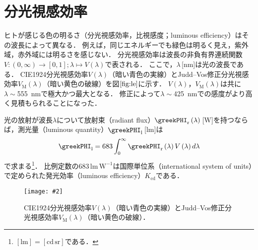 \documentclass[uplatex,paper=a4,fontsize=4.0truemm,jafontsize=4.0truemm,head_space=30.0truemm,foot_space=30.0truemm,baselineskip=8.0truemm,line_length=40zw,gutter=25.0truemm,oneside,openany,fleqn,hanging_panctuation,open_bracket_pos=nibu_tentsuki,dvipdfmx,jis2004,book,titlepage]{jlreq}
\theoremstyle{mystyle}
\newcommand{\captiondot}[1]{\caption{#1．}}
\newcommand{\figureinput}[4]{\begin{figure}[btp]\centering\texttt{[image: \#2]}\captiondot{#3}\label{fig:#4}\end{figure}}
\newcommand{\mathdisplaystyle}[1]{\(\displaystyle{#1}\)}
\newcommand{\Reference}[1]{\mathdisplaystyle{\ref{#1}}}
\newcommand{\negativevalue}[1]{{-#1}}
\newcommand{\parentheses}[1]{\left(#1\right)}
\newcommand{\squarebrackets}[1]{\left[#1\right]}
\begin{document}
		\section{分光視感効率}
			ヒトが感じる色の明るさ（分光視感効率，比視感度；luminous efficiency）はその波長によって異なる．
			例えば，同じエネルギーでも緑色は明るく見え，紫外域，赤外域には明るさを感じない．
			分光視感効率は波長の非負有界連続関数\mathdisplaystyle{V\colon\parentheses{0,\infty}\to\squarebrackets{0,1};\lambda\mapsto V\parentheses{\lambda}}で表される．
			ここで，\mathdisplaystyle{\lambda}\,[nm]は光の波長である．
			CIE1924分光視感効率\mathdisplaystyle{V\parentheses{\lambda}}（暗い青色の実線）とJudd--Vos修正分光視感効率\mathdisplaystyle{V_\textrm{M}\parentheses{\lambda}}\cite{Vos1978}（暗い黄色の破線）を図\Reference{fig:le}に示す．
			\mathdisplaystyle{V\parentheses{\lambda}}，\mathdisplaystyle{V_\textrm{M}\parentheses{\lambda}}は共に\mathdisplaystyle{\lambda\sim{}}\SI{555}{nm}で極大かつ最大となる．
			修正によって\mathdisplaystyle{\lambda\sim{}}\SI{425}{nm}での感度がより高く見積もられることになった．

			光の放射が波長\mathdisplaystyle{\lambda}について放射束（radiant flux）\mathdisplaystyle{\greekPHI_\textrm{r}\parentheses{\lambda}}\,[W]を持つならば，測光量（luminous quantity）\mathdisplaystyle{\greekPHI_\textrm{l}}\,[lm]は
			\begin{equation*}
				\greekPHI_\textrm{l}=683\int_0^\infty{\greekPHI_\textrm{r}\parentheses{\lambda}V\parentheses{\lambda}}\,d\lambda
			\end{equation*}
			で求まる\footnote{\mathdisplaystyle{[\textrm{lm}]=[\textrm{cd}\,\textrm{sr}]}である．}．
			比例定数の683\,lm\,\mathdisplaystyle{\textrm{W}^{\negativevalue{1}}}は国際単位系（international system of units）で定められた発光効率（luminous efficiency）\mathdisplaystyle{K_\textrm{cd}}である．
			\figureinput{width=\linewidth}{D:/a/figs/le.png}{CIE1924分光視感効率\mathdisplaystyle{V\parentheses{\lambda}}（暗い青色の実線）とJudd--Vos修正分光視感効率\mathdisplaystyle{V_\textrm{M}\parentheses{\lambda}}（暗い黄色の破線）}{le}
\end{document}
